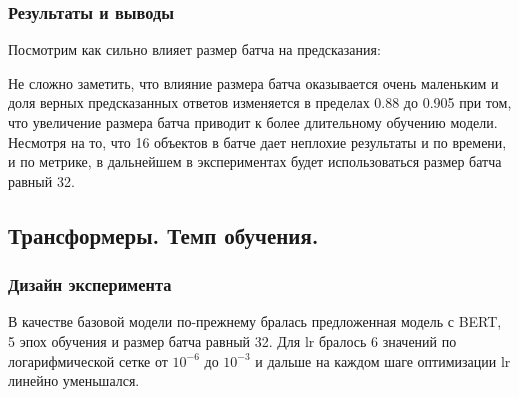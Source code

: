 \documentclass{article}
\begin{document}
\subsubsection{Результаты и выводы}
Посмотрим как сильно влияет размер батча на предсказания:
\begin{figure}[h]
    \caption{}
	\label{eq:batch}
\end{figure}
Не сложно заметить, что влияние размера батча оказывается очень маленьким и доля верных предсказанных ответов изменяется в пределах 0.88 до 0.905 при том, что увеличение размера батча приводит к более длительному обучению модели. Несмотря на то, что 16 объектов в батче дает неплохие результаты и по времени, и по метрике, в дальнейшем в экспериментах будет использоваться размер батча равный 32. 

\subsection{Трансформеры. Темп обучения.}
\subsubsection{Дизайн эксперимента}
В качестве базовой модели по-прежнему бралась предложенная модель с BERT, 5 эпох обучения и размер батча равный 32. Для lr бралось 6 значений по логарифмической сетке от $10^{-6}$ до $10^{-3}$ и дальше на каждом шаге оптимизации lr линейно уменьшался. 
\end{document}
